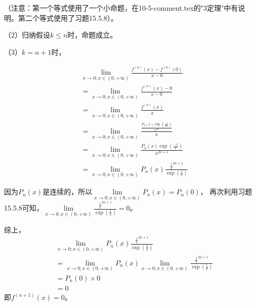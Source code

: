 \documentclass{article}
\begin{document}
\begin{itemize}
\begin{itemize}
                （注意：第一个等式使用了一个小命题，在10-5-comment.tex的"3定理"中有说明。第二个等式使用了习题15.5.8）。

                （2）归纳假设$k \leq n$时，命题成立。

                （3）$k = n + 1$时，

                \begin{align*}
                   & \lim\limits_{x \to 0; x \in (0, + \infty)} \frac{f^{(n)}(x) - f^{(n)}(0)}{x - 0}                 \\
                   & = \lim\limits_{x \to 0; x \in (0, + \infty)} \frac{f^{(n)}(x) - 0}{x - 0}                        \\
                   & = \lim\limits_{x \to 0; x \in (0, + \infty)} \frac{f^{(n)}(x)}{x}                                \\
                   & = \lim\limits_{x \to 0; x \in (0, + \infty)} \frac{\frac{P_n(x)\exp(\frac{-1}{x})}{x^{2n}}}{x}   \\
                   & = \lim\limits_{x \to 0; x \in (0, + \infty)} \frac{P_n(x)\exp(\frac{-1}{x})}{x^{2n+1}}           \\
                   & = \lim\limits_{x \to 0; x \in (0, + \infty)} P_n(x) \frac{\frac{1}{x}^{2n+1}}{\exp(\frac{1}{x})}
                \end{align*}

                因为$P_n(x)$是连续的，所以$\lim\limits_{x \to 0; x \in (0, + \infty)} P_n(x) = P_n(0)$，
                再次利用习题15.5.8可知，$\lim\limits_{x \to 0; x \in (0, + \infty)} \frac{\frac{1}{x}^{2n+1}}{\exp(\frac{1}{x})} = 0$。

                综上，
                \begin{align*}
                   & \lim\limits_{x \to 0; x \in (0, + \infty)} P_n(x) \frac{\frac{1}{x}^{2n+1}}{\exp(\frac{1}{x})}                                              \\
                   & = \lim\limits_{x \to 0; x \in (0, + \infty)} P_n(x) \lim\limits_{x \to 0; x \in (0, + \infty)} \frac{\frac{1}{x}^{2n+1}}{\exp(\frac{1}{x})} \\
                   & = P_n(0) \times 0                                                                                                                           \\
                   & = 0
                \end{align*}
                即$f^{(n + 1)}(x) = 0$。


\end{itemize}
\end{itemize}
\end{document}
